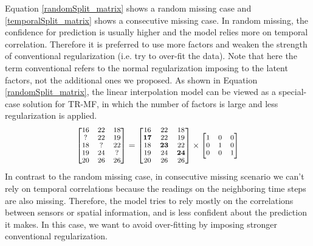 Equation \ref{randomSplit_matrix} shows a random missing case and \ref{temporalSplit_matrix} shows a consecutive missing case. In random missing, the confidence for prediction is usually higher and the model relies more on temporal correlation. Therefore it is preferred to use more factors and weaken the strength of conventional regularization (i.e. try to over-fit the data). Note that here the term conventional refers to the normal regularization imposing to the latent factors, not the additional ones we proposed. 
As shown in Equation \ref{randomSplit_matrix}, the linear interpolation model can be viewed as a special-case solution for TR-MF, in which the number of factors is large and less regularization is applied. 
\begin{equation}
\small
\label{randomSplit_matrix}
\begin{bmatrix}
16 & 22 & 18\\
 ? & 22 & 19\\
18 &  ?	& 22\\
19 & 24 &  ?\\
20 & 26 & 26\\
\end{bmatrix} 
= 
\begin{bmatrix}
16 & 22 & 18\\
\mathbf{17} & 22 & 19\\
18 & \mathbf{23}	& 22\\
19 & 24 & \mathbf{24}\\
20 & 26 & 26\\
\end{bmatrix} 
\times
\begin{bmatrix}
1 & 0 & 0\\
0 & 1 & 0\\
0 & 0 & 1\\
\end{bmatrix} 
\end{equation}
In contrast to the random missing case, in consecutive missing scenario we can't rely on temporal correlations because the readings on the neighboring time steps are also missing. Therefore, the model tries to rely mostly on the correlations between sensors or spatial information, and is less confident about the prediction it makes. In this case, we want to avoid over-fitting by imposing stronger conventional regularization.
